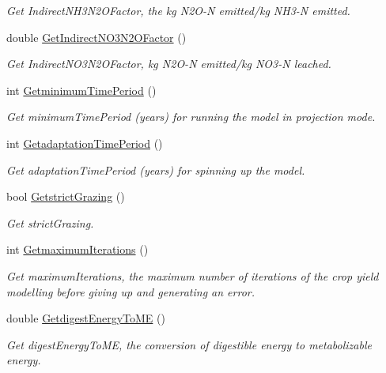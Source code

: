 \begin{DoxyCompactItemize}
\begin{DoxyCompactList}\small\item\em Get Indirect\+N\+H3\+N2\+O\+Factor, the kg N2\+O-\/N emitted/kg N\+H3-\/N emitted. \end{DoxyCompactList}\item 
double \mbox{\hyperlink{class_global_vars_a96a22d5ba43a69c0c1dd9b658e1117d4}{Get\+Indirect\+N\+O3\+N2\+O\+Factor}} ()
\begin{DoxyCompactList}\small\item\em Get Indirect\+N\+O3\+N2\+O\+Factor, kg N2\+O-\/N emitted/kg N\+O3-\/N leached. \end{DoxyCompactList}\item 
int \mbox{\hyperlink{class_global_vars_a05ac334d81bb66ad2ffc14bc0bd50d8f}{Getminimum\+Time\+Period}} ()
\begin{DoxyCompactList}\small\item\em Get minimum\+Time\+Period (years) for running the model in projection mode. \end{DoxyCompactList}\item 
int \mbox{\hyperlink{class_global_vars_a99d4a8bf901825a4b989622dc83e288b}{Getadaptation\+Time\+Period}} ()
\begin{DoxyCompactList}\small\item\em Get adaptation\+Time\+Period (years) for spinning up the model. \end{DoxyCompactList}\item 
bool \mbox{\hyperlink{class_global_vars_a0fc8e12399cf9407f2d87a416491f97f}{Getstrict\+Grazing}} ()
\begin{DoxyCompactList}\small\item\em Get strict\+Grazing. \end{DoxyCompactList}\item 
int \mbox{\hyperlink{class_global_vars_afda3fc18e970456a249b8f14b5766f60}{Getmaximum\+Iterations}} ()
\begin{DoxyCompactList}\small\item\em Get maximum\+Iterations, the maximum number of iterations of the crop yield modelling before giving up and generating an error. \end{DoxyCompactList}\item 
double \mbox{\hyperlink{class_global_vars_a8ceb7bfad1004e6ae1dfbe988f2016c7}{Getdigest\+Energy\+To\+ME}} ()
\begin{DoxyCompactList}\small\item\em Get digest\+Energy\+To\+ME, the conversion of digestible energy to metabolizable energy. \end{DoxyCompactList}\item 

\end{DoxyCompactItemize}
